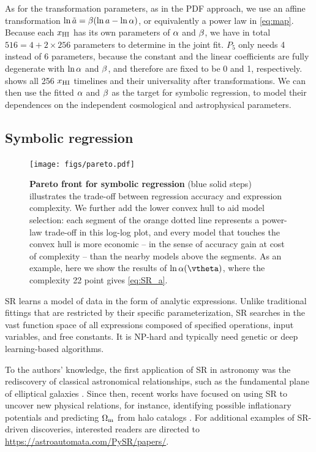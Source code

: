 As for the transformation parameters, as in the PDF approach, we use an
affine transformation $\ln\tilde{a} = \beta (\ln a - \ln\alpha)$, or equivalently
a power law in \cref{eq:map}.
Because each $x_{\mathrm{HI}}$ has its own parameters of $\alpha$ and $\beta$, we
have in total $516 = 4 + 2 \times 256$ parameters to determine in the
joint fit.
$P_5$ only needs 4 instead of 6 parameters, because the constant and the
linear coefficients are fully degenerate with $\ln\alpha$ and $\beta$, and
therefore are fixed to be 0 and 1, respectively.
 shows all 256 $x_{\mathrm{HI}}$ timelines and their universality
after transformations.
We can then use the fitted $\alpha$ and $\beta$ as the target for symbolic
regression, to model their dependences on the independent cosmological
and astrophysical parameters.


\subsection*{Symbolic regression}
\label{ssec:pysr}

\begin{figure}[tb]
\centering
\texttt{[image: figs/pareto.pdf]}
\caption{\textbf{Pareto front for symbolic regression} (blue solid
steps) illustrates the trade-off between regression accuracy and
expression complexity.
We further add the lower convex hull to aid model selection: each
segment of the orange dotted line represents a power-law trade-off in
this log-log plot, and every model that touches the convex hull is more
economic -- in the sense of accuracy gain at cost of complexity -- than
the nearby models above the segments.
As an example, here we show the results of $\ln\ap(\vtheta)$, where the
complexity 22 point gives \cref{eq:SR_a}.}
\label{fig:pareto}
\end{figure}

SR learns a model of data in the form of analytic expressions.
Unlike traditional fittings that are restricted by their specific
parameterization, SR searches in the vast function space of all
expressions composed of specified operations, input variables, and free
constants.
It is NP-hard \cite{SongEtAl2024, VirgolinPissis2022} and typically need
genetic or deep learning-based algorithms.

To the authors' knowledge, the first application of SR in astronomy was
the rediscovery of classical astronomical relationships, such as the
fundamental plane of elliptical galaxies \cite{Graham2013}.
Since then, recent works have focused on using SR to uncover new
physical relations, for instance, identifying possible inflationary
potentials \cite{Sousa2024} and predicting $\Omega_\mathrm{m}$ from halo catalogs
\cite{Shao2023}.
For additional examples of SR-driven discoveries, interested readers are
directed to \url{https://astroautomata.com/PySR/papers/}.

